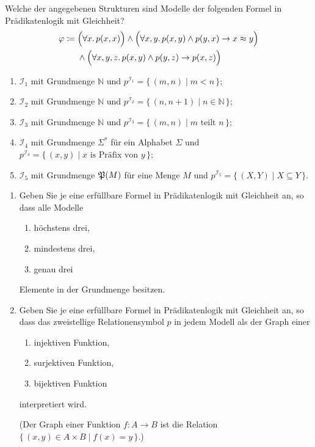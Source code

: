 \documentclass[german]{latteachCD}[2017/03/28]
\begin{document}
\clearpage

\enlargethispage{4\baselineskip}

\setcounter{exercise}{0}

\begin{exercise}
  Welche der angegebenen Strukturen sind Modelle der folgenden Formel in
  Prädikatenlogik mit Gleichheit?
  \begin{align*}
    \phi \coloneqq{}
    & \Bigl(\forall x.\, p(x,x)\Bigr) \land \Bigl(\forall x, y.\, p(x,y) \land
      p(y,x) \to x \approx y\Bigr)\\
    &\land \Bigl(\forall x, y, z.\, p(x,y) \land p(y,z) \to p(x,z)\Bigr)
  \end{align*}
  \begin{enumerate}
  \item $\mathcal{I}_{1}$ mit Grundmenge $\mathbb N$ und $p^{\mathcal{I}_{1}} =
    \{\,(m,n) \mid m < n \,\}$;
  \item $\mathcal{I}_{2}$ mit Grundmenge $\mathbb N$ und $p^{\mathcal{I}_{2}} =
    \{\,(n,n+1) \mid n \in \mathbb N \,\}$;
  \item $\mathcal{I}_{3}$ mit Grundmenge $\mathbb N$ und $p^{\mathcal{I}_{3}} =
    \{\,(m,n) \mid m \text{ teilt } n\,\}$;
  \item $\mathcal{I}_{4}$ mit Grundmenge $\Sigma^{*}$ für ein Alphabet $\Sigma$
    und $p^{\mathcal{I}_{4}} = \{\,(x,y) \mid x \text{ is Präfix von } y\,\}$;
  \item $\mathcal{I}_{5}$ mit Grundmenge $\subsets{M}$ für eine Menge $M$ und
    $p^{\mathcal{I}_{5}} = \{\,(X,Y) \mid X \subseteq Y\,\}$.
  \end{enumerate}
\end{exercise}

\begin{exercise}
  \begin{enumerate}
  \item Geben Sie je eine erfüllbare Formel in Prädikatenlogik mit Gleichheit
    an, so dass alle Modelle
    \begin{enumerate}
    \item höchstens drei,
    \item mindestens drei,
    \item genau drei
    \end{enumerate}
    Elemente in der Grundmenge besitzen.
  \item Geben Sie je eine erfüllbare Formel in Prädikatenlogik mit Gleichheit
    an, so dass das zweistellige Relationensymbol $p$ in jedem Modell als der
    Graph einer
    \begin{enumerate}
    \item injektiven Funktion,
    \item surjektiven Funktion,
    \item bijektiven Funktion
    \end{enumerate}
    interpretiert wird.

    (Der Graph einer Funktion $f \colon A \to B$ ist die Relation $\{\,(x,y) \in
    A \times B \mid f(x) = y\,\}$.)
  \end{enumerate}
\end{exercise}
\end{document}
